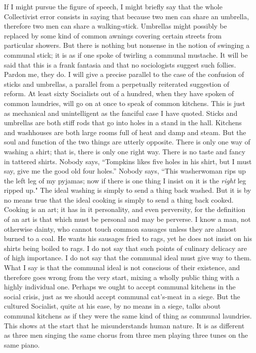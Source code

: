 \documentclass{book}
\begin{document}
If I might pursue the figure of speech, I might briefly say that the whole Collectivist error consists in saying that because two men can share an umbrella, therefore two men can share a walking-stick. Umbrellas might possibly be replaced by some kind of common awnings covering certain streets from particular showers. But there is nothing but nonsense in the notion of swinging a communal stick; it is as if one spoke of twirling a communal mustache. It will be said that this is a frank fantasia and that no sociologists suggest such follies. Pardon me, they do. I will give a precise parallel to the case of the confusion of sticks and umbrellas, a parallel from a perpetually reiterated suggestion of reform. At least sixty Socialists out of a hundred, when they have spoken of common laundries, will go on at once to speak of common kitchens. This is just as mechanical and unintelligent as the fanciful case I have quoted. Sticks and umbrellas are both stiff rods that go into holes in a stand in the hall. Kitchens and washhouses are both large rooms full of heat and damp and steam. But the soul and function of the two things are utterly opposite. There is only one way of washing a shirt; that is, there is only one right way. There is no taste and fancy in tattered shirts. Nobody says, “Tompkins likes five holes in his shirt, but I must say, give me the good old four holes.” Nobody says, “This washerwoman rips up the left leg of my pyjamas; now if there is one thing I insist on it is the \emph{right} leg ripped up." The ideal washing is simply to send a thing back washed. But it is by no means true that the ideal cooking is simply to send a thing back cooked. Cooking is an art; it has in it personality, and even perversity, for the definition of an art is that which must be personal and may be perverse. I know a man, not otherwise dainty, who cannot touch common sausages unless they are almost burned to a coal. He wants his sausages fried to rags, yet he does not insist on his shirts being boiled to rags. I do not say that such points of culinary delicacy are of high importance. I do not say that the communal ideal must give way to them. What I say is that the communal ideal is not conscious of their existence, and therefore goes wrong from the very start, mixing a wholly public thing with a highly individual one. Perhaps we ought to accept communal kitchens in the social crisis, just as we should accept communal cat’s-meat in a siege. But the cultured Socialist, quite at his ease, by no means in a siege, talks about communal kitchens as if they were the same kind of thing as communal laundries. This shows at the start that he misunderstands human nature. It is as different as three men singing the same chorus from three men playing three tunes on the same piano.
\end{document}

